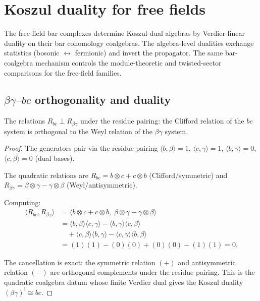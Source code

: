 \section{Koszul duality for free fields}\label{sec:koszul-duality-free-fields}

The free-field bar complexes determine Koszul-dual algebras by
Verdier-linear duality on their bar cohomology coalgebras. The
algebra-level dualities exchange statistics (bosonic
$\leftrightarrow$ fermionic) and invert the propagator. The same
bar-coalgebra mechanism controls the module-theoretic and
twisted-sector comparisons for the free-field families.

\subsection{\texorpdfstring{$\beta\gamma$--$bc$}{beta-gamma--bc} orthogonality and duality}

\begin{proposition}\label{prop:bc-betagamma-orthogonality}
The relations $R_{bc} \perp R_{\beta\gamma}$ under the residue pairing: the Clifford relation of the $bc$ system is orthogonal to the Weyl relation of the $\beta\gamma$ system.
\end{proposition}

\begin{proof}
The generators pair via the residue pairing $\langle b, \beta \rangle = 1$, $\langle c, \gamma \rangle = 1$, $\langle b, \gamma \rangle = 0$, $\langle c, \beta \rangle = 0$ (dual bases).

The quadratic relations are $R_{bc} = b \otimes c + c \otimes b$ (Clifford/symmetric) and $R_{\beta\gamma} = \beta \otimes \gamma - \gamma \otimes \beta$ (Weyl/antisymmetric).

Computing:
\begin{align*}
\langle R_{bc}, R_{\beta\gamma} \rangle &= \langle b \otimes c + c \otimes b, \; \beta \otimes \gamma - \gamma \otimes \beta \rangle \\
&= \langle b, \beta \rangle \langle c, \gamma \rangle - \langle b, \gamma \rangle \langle c, \beta \rangle \\
&\quad + \langle c, \beta \rangle \langle b, \gamma \rangle - \langle c, \gamma \rangle \langle b, \beta \rangle \\
&= (1)(1) - (0)(0) + (0)(0) - (1)(1) = 0.
\end{align*}

The cancellation is exact: the symmetric relation $(+)$ and
antisymmetric relation $(-)$ are orthogonal complements under the
residue pairing. This is the quadratic coalgebra datum whose
finite Verdier dual gives the Koszul duality
$(\beta\gamma)^! \cong bc$.
\end{proof}


